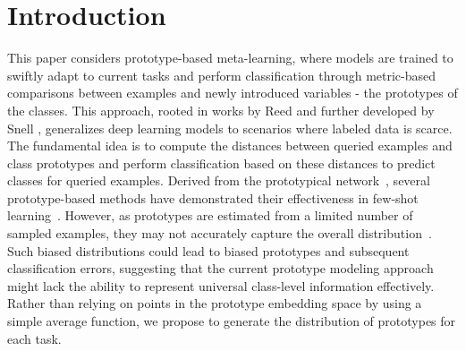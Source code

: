 \section{Introduction}

This paper considers prototype-based meta-learning, where models are trained to swiftly adapt to current tasks and perform classification through metric-based comparisons between examples and newly introduced variables - the prototypes of the classes. This approach, rooted in works by Reed \cite{reed1972pattern} and further developed by Snell \etal \cite{snell2017prototypical}, generalizes deep learning models to scenarios where labeled data is scarce. The fundamental idea is to compute the distances between queried examples and class prototypes and perform classification based on these distances to predict classes for queried examples. Derived from the prototypical network~\cite{snell2017prototypical}, several prototype-based methods have demonstrated their effectiveness in few-shot learning~\cite{allen2019infinite, ding2021prototypical, du2021hierarchical, zhen2020memory}. However, as prototypes are estimated from a limited number of sampled examples, they may not accurately capture the overall distribution~\cite{yang2021free, zhen2020memory}. Such biased distributions could lead to biased prototypes and subsequent classification errors, suggesting that the current prototype modeling approach might lack the ability to represent universal class-level information effectively.  Rather than relying on points in the prototype embedding space by using a simple average function, we propose to generate the distribution of prototypes for each task.



